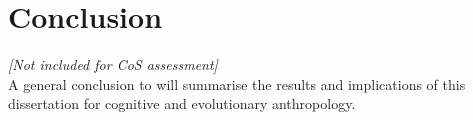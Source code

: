 \chapter{\label{conclusion}Conclusion}

\textit{[Not included for CoS assessment]} \\
A general conclusion to will summarise the results and implications of this dissertation for cognitive and evolutionary anthropology.
